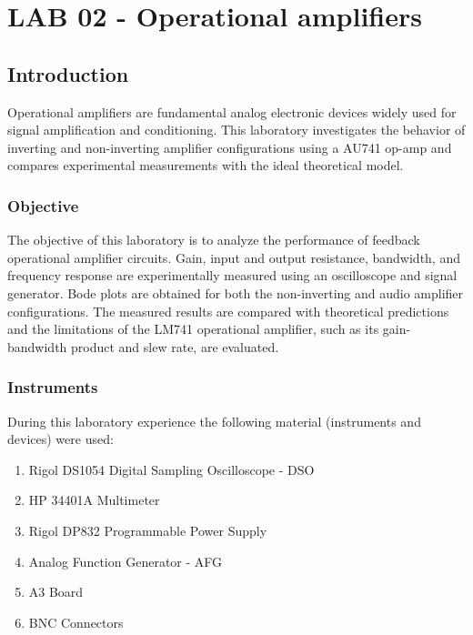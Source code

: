 \documentclass[../main.tex]{subfiles}
\begin{document}
\newpage

\clearpage
\thispagestyle{empty}

\vspace*{7cm}
\section{LAB 02 - Operational amplifiers}
\vspace*{1.5cm}


\subsection{Introduction}
\label{introlab02}

Operational amplifiers are fundamental analog electronic devices widely used for signal amplification and conditioning. This laboratory investigates the behavior of inverting and non-inverting amplifier configurations using a AU741 op-amp and compares experimental measurements with the ideal theoretical model.

\subsubsection*{Objective}

The objective of this laboratory is to analyze the performance of feedback operational amplifier circuits. Gain, input and output resistance, bandwidth, and frequency response are experimentally measured using an oscilloscope and signal generator. Bode plots are obtained for both the non-inverting and audio amplifier configurations. The measured results are compared with theoretical predictions and the limitations of the LM741 operational amplifier, such as its gain-bandwidth product and slew rate, are evaluated.

\subsubsection*{Instruments}

During this laboratory experience the following material (instruments and devices) were used:

\begin{enumerate}[label=\textbf{-}]
	\item Rigol DS1054 Digital Sampling Oscilloscope - DSO
	\item HP 34401A Multimeter
	\item Rigol DP832 Programmable Power Supply
	\item Analog Function Generator - AFG
	\item A3 Board
	\item BNC Connectors
\end{enumerate}
\end{document}
